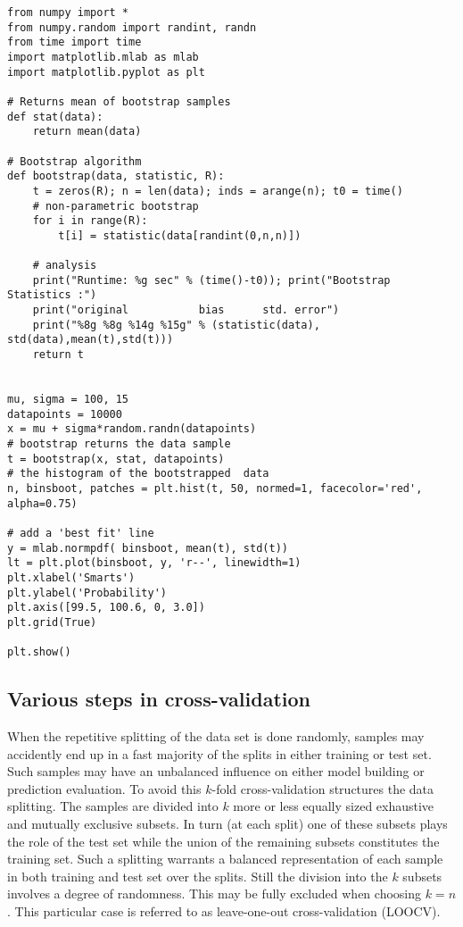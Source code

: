 \documentclass[%
oneside,                 %
final,                   %
10pt]{article}
\begin{document}
\begin{verbatim}
from numpy import *
from numpy.random import randint, randn
from time import time
import matplotlib.mlab as mlab
import matplotlib.pyplot as plt

# Returns mean of bootstrap samples                                                                                                                                                
def stat(data):
    return mean(data)

# Bootstrap algorithm
def bootstrap(data, statistic, R):
    t = zeros(R); n = len(data); inds = arange(n); t0 = time()
    # non-parametric bootstrap         
    for i in range(R):
        t[i] = statistic(data[randint(0,n,n)])

    # analysis    
    print("Runtime: %g sec" % (time()-t0)); print("Bootstrap Statistics :")
    print("original           bias      std. error")
    print("%8g %8g %14g %15g" % (statistic(data), std(data),mean(t),std(t)))
    return t


mu, sigma = 100, 15
datapoints = 10000
x = mu + sigma*random.randn(datapoints)
# bootstrap returns the data sample                                    
t = bootstrap(x, stat, datapoints)
# the histogram of the bootstrapped  data                                                                                                    
n, binsboot, patches = plt.hist(t, 50, normed=1, facecolor='red', alpha=0.75)

# add a 'best fit' line  
y = mlab.normpdf( binsboot, mean(t), std(t))
lt = plt.plot(binsboot, y, 'r--', linewidth=1)
plt.xlabel('Smarts')
plt.ylabel('Probability')
plt.axis([99.5, 100.6, 0, 3.0])
plt.grid(True)

plt.show()

\end{verbatim}


\subsection*{Various steps in cross-validation}

When the repetitive splitting of the data set is done randomly,
samples may accidently end up in a fast majority of the splits in
either training or test set. Such samples may have an unbalanced
influence on either model building or prediction evaluation. To avoid
this $k$-fold cross-validation structures the data splitting. The
samples are divided into $k$ more or less equally sized exhaustive and
mutually exclusive subsets. In turn (at each split) one of these
subsets plays the role of the test set while the union of the
remaining subsets constitutes the training set. Such a splitting
warrants a balanced representation of each sample in both training and
test set over the splits. Still the division into the $k$ subsets
involves a degree of randomness. This may be fully excluded when
choosing $k=n$. This particular case is referred to as leave-one-out
cross-validation (LOOCV). 
\end{document}
